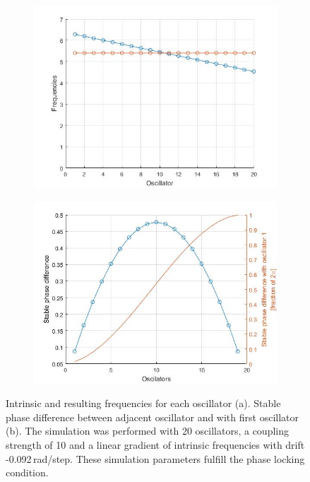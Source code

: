\documentclass[a4paper]{scrartcl}
\begin{document}
\begin{figure}[h]
	\centering
	\begin{subfigure}[b]{0.49\textwidth}
		\centering
		\includegraphics[width=\textwidth]{results/6.b/propaWaveFreq.jpg}
		\caption{}
	\end{subfigure}
	\centering
	\begin{subfigure}[b]{0.49\textwidth}
		\centering
		\includegraphics[width=\textwidth]{results/6.b/propaWavePhase.jpg}
		\caption{}
	\end{subfigure}
	\caption{Intrinsic and resulting frequencies for each oscillator (a). Stable phase difference between adjacent oscillator and with first oscillator (b). The simulation was performed with 20 oscillators, a coupling strength of 10 and a linear gradient of intrinsic frequencies with drift -0.092\,rad/step. These simulation parameters fulfill the phase locking condition.}\label{prop}
\end{figure}
\end{document}
